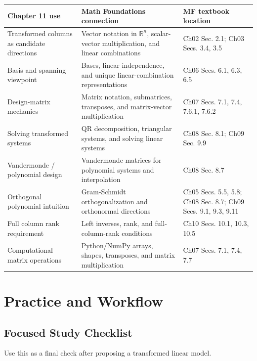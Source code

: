 {\begin{center}
\begin{tabular}{|p{}|p{}|p{}|}
\hline
\textbf{Chapter 11 use} & \textbf{Math Foundations connection} & \textbf{MF textbook location} \\
\hline
Transformed columns as candidate directions & Vector notation in \(\mathbb{R}^n\), scalar-vector multiplication, and linear combinations & Ch02 Sec. 2.1; Ch03 Secs. 3.4, 3.5 \\
\hline
Basis and spanning viewpoint & Bases, linear independence, and unique linear-combination representations & Ch06 Secs. 6.1, 6.3, 6.5 \\
\hline
Design-matrix mechanics & Matrix notation, submatrices, transposes, and matrix-vector multiplication & Ch07 Secs. 7.1, 7.4, 7.6.1, 7.6.2 \\
\hline
Solving transformed systems & QR decomposition, triangular systems, and solving linear systems & Ch08 Sec. 8.1; Ch09 Sec. 9.9 \\
\hline
Vandermonde / polynomial design & Vandermonde matrices for polynomial systems and interpolation & Ch08 Sec. 8.7 \\
\hline
Orthogonal polynomial intuition & Gram-Schmidt orthogonalization and orthonormal directions & Ch05 Secs. 5.5, 5.8; Ch08 Sec. 8.7; Ch09 Secs. 9.1, 9.3, 9.11 \\
\hline
Full column rank requirement & Left inverses, rank, and full-column-rank conditions & Ch10 Secs. 10.1, 10.3, 10.5 \\
\hline
Computational matrix operations & Python/NumPy arrays, shapes, transposes, and matrix multiplication & Ch07 Secs. 7.1, 7.4, 7.7 \\
\hline
\end{tabular}
\end{center}

\section{Practice and Workflow}
\subsection*{Focused Study Checklist}

Use this as a final check after proposing a transformed linear model.

}
